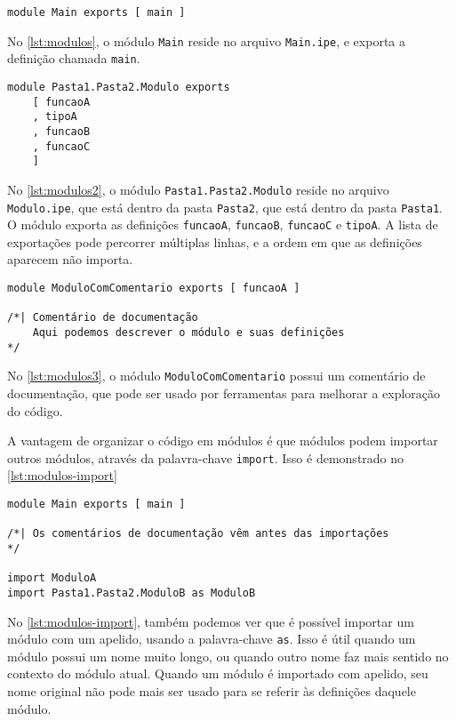 \begin{lstlisting}[label={lst:modulos},caption={Exemplo de módulos}]
module Main exports [ main ]
\end{lstlisting}

No \autoref{lst:modulos}, o módulo \texttt{Main} reside no arquivo \texttt{Main.ipe},
e exporta a definição chamada \texttt{main}.

\begin{lstlisting}[label={lst:modulos2},caption={Exemplo de módulo em subpasta que exporta várias definições}]
module Pasta1.Pasta2.Modulo exports
    [ funcaoA
    , tipoA
    , funcaoB
    , funcaoC
    ]
\end{lstlisting}

No \autoref{lst:modulos2}, o módulo \texttt{Pasta1.Pasta2.Modulo} reside no arquivo
\texttt{Modulo.ipe}, que está dentro da pasta \texttt{Pasta2}, que está dentro da
pasta \texttt{Pasta1}. O módulo exporta as definições \texttt{funcaoA}, \texttt{funcaoB},
\texttt{funcaoC} e \texttt{tipoA}. A lista de exportações pode percorrer múltiplas
linhas, e a ordem em que as definições aparecem não importa.

\begin{lstlisting}[label={lst:modulos3},caption={Exemplo de módulo com comentário de documentação}]
module ModuloComComentario exports [ funcaoA ]

/*| Comentário de documentação
    Aqui podemos descrever o módulo e suas definições
*/
\end{lstlisting}

No \autoref{lst:modulos3}, o módulo \texttt{ModuloComComentario} possui um comentário
de documentação, que pode ser usado por ferramentas para melhorar a exploração
do código.

A vantagem de organizar o código em módulos é que módulos podem importar outros
módulos, através da palavra-chave \texttt{import}. Isso é demonstrado no
\autoref{lst:modulos-import}

\begin{lstlisting}[label={lst:modulos-import},caption={Exemplo de importação de módulos}]
module Main exports [ main ]

/*| Os comentários de documentação vêm antes das importações
*/

import ModuloA
import Pasta1.Pasta2.ModuloB as ModuloB
\end{lstlisting}

No \autoref{lst:modulos-import}, também podemos ver que é possível importar um
módulo com um apelido, usando a palavra-chave \texttt{as}. Isso é útil quando
um módulo possui um nome muito longo, ou quando outro nome faz mais sentido no
contexto do módulo atual. Quando um módulo é importado com apelido, seu nome
original não pode mais ser usado para se referir às definições daquele módulo.

